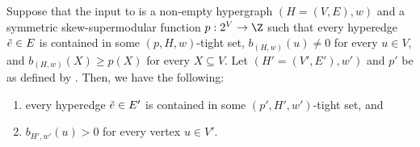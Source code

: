 \begin{lemma}\label{lem:weak-to-strong-cover:next-recursive-call-hypothesis-satification:hyperedge-in-tight-set-positive-coverage}
Suppose that the input to  is a non-empty hypergraph $(H = (V, E), w)$ and a symmetric skew-supermodular function $p:2^V\rightarrow \Z$ %
such that every hyperedge $\Tilde{e} \in E$ is contained in some $(p, H, w)$-tight set, $b_{(H,w)}(u) \not = 0$ for every $u \in V$, and $b_{(H,w)}(X) \geq p(X)$ for every $X \subseteq V$. 
Let $(H' = (V', E'), w')$ and $p'$ be as defined by . Then, we have the following:
\begin{enumerate}
    \item every hyperedge $\Tilde{e} \in E'$ is contained in some $(p', H', w')$-tight set, and
    \item  $b_{H',w'}(u) > 0$ for every vertex $u \in V'$.
\end{enumerate}
\end{lemma}
